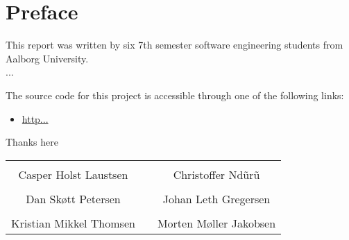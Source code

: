 \thispagestyle{empty}
\section*{Preface}
This report was written by six 7th semester software engineering students from Aalborg University.\\

...

\noindent The source code for this project is accessible through one of the following links:
\begin{itemize}
\item \url{http...}
\end{itemize}

\vspace{.2cm}
\noindent Thanks here

\begin{table}[H]
	\centering
	\vspace{2cm}
		\begin{tabular}{c c c}
			\underline{\phantom{JAERJAERJAERJAERGO}} & \phantom{cookies} & \underline{\phantom{JAERJAERJAERJAERGO}} \\
			Casper Holst Laustsen & \phantom{cookies} & Christoffer Ndũrũ\\[1.5cm]
		    \underline{\phantom{JAERJAERJAERJAERGO}} & \phantom{cookies} & \underline{\phantom{JAERJAERJAERJAERGO}} \\
			Dan Skøtt Petersen & \phantom{cookies} & Johan Leth Gregersen\\[1.5cm]
			\underline{\phantom{JAERJAERJAERJAERGO}} & \phantom{cookies} & \underline{\phantom{JAERJAERJAERJAERGO}} \\ 
			Kristian Mikkel Thomsen & \phantom{cookies} & Morten Møller Jakobsen\\[.5cm]				
		\end{tabular}
\end{table}